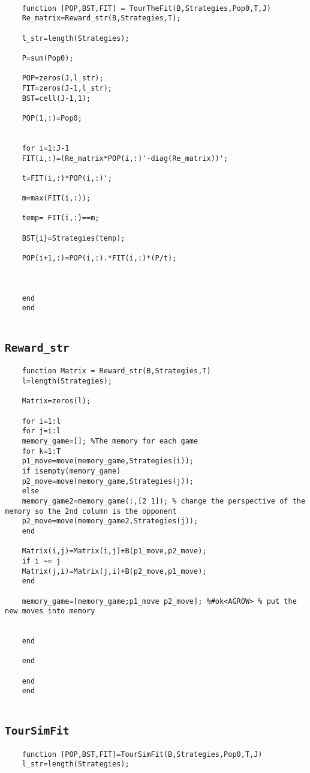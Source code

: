 \begin{appendices}
\label{appendix:TourTF}
\begin{lstlisting}
	
	function [POP,BST,FIT] = TourTheFit(B,Strategies,Pop0,T,J)
	Re_matrix=Reward_str(B,Strategies,T);
	
	l_str=length(Strategies);
	
	P=sum(Pop0);
	
	POP=zeros(J,l_str);
	FIT=zeros(J-1,l_str);
	BST=cell(J-1,1);
	
	POP(1,:)=Pop0;
	
	
	for i=1:J-1
	FIT(i,:)=(Re_matrix*POP(i,:)'-diag(Re_matrix))';
	
	t=FIT(i,:)*POP(i,:)';
	
	m=max(FIT(i,:));
	
	temp= FIT(i,:)==m;
	
	BST{i}=Strategies(temp);
	
	POP(i+1,:)=POP(i,:).*FIT(i,:)*(P/t);
	
	
	
	end
	end
	
\end{lstlisting}

\subsection*{\texttt{Reward\_str}}
\label{appendix:RewST}
\begin{lstlisting}
	function Matrix = Reward_str(B,Strategies,T)
	l=length(Strategies);
	
	Matrix=zeros(l);
	
	for i=1:l
	for j=i:l
	memory_game=[]; %The memory for each game
	for k=1:T
	p1_move=move(memory_game,Strategies(i));
	if isempty(memory_game)
	p2_move=move(memory_game,Strategies(j));
	else
	memory_game2=memory_game(:,[2 1]); % change the perspective of the memory so the 2nd column is the opponent
	p2_move=move(memory_game2,Strategies(j));
	end
	
	Matrix(i,j)=Matrix(i,j)+B(p1_move,p2_move);
	if i ~= j
	Matrix(j,i)=Matrix(j,i)+B(p2_move,p1_move);
	end
	
	memory_game=[memory_game;p1_move p2_move]; %#ok<AGROW> % put the new moves into memory
	
	
	end
	
	end
	
	end
	end
	
\end{lstlisting}

\subsection*{\texttt{TourSimFit}}
\label{appendix:TSF}
\begin{lstlisting}
	function [POP,BST,FIT]=TourSimFit(B,Strategies,Pop0,T,J)
	l_str=length(Strategies);
	

\end{lstlisting}
\end{appendices}

